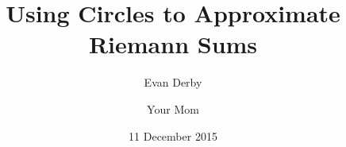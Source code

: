 \documentclass{article}
\begin{document}
  \title{Using Circles to Approximate Riemann Sums}
  \author{Evan Derby \and Your Mom}
  \date{11 December 2015}
  \maketitle
\end{document}
